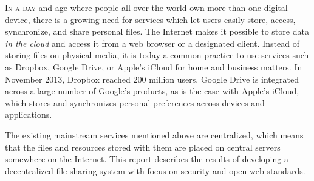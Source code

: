 \lettrine[lines=2, findent=2pt]{I}{n a day} and age where people all over the world own more than one digital device\cite{OFCOMa:Online}\cite{OFCOMb:Online}, there is a growing need for services which let users easily store, access, synchronize, and share personal files. The Internet makes it possible to store data \emph{in the cloud} and access it from a web browser or a designated client. Instead of storing files on physical media, it is today a common practice to use services such as Dropbox, Google Drive, or Apple's iCloud for home and business matters. In November 2013, Dropbox reached 200 million users\cite{Constine:2013:Online}. Google Drive is integrated across a large number of Google's products, as is the case with Apple's iCloud, which stores and synchronizes personal preferences across devices and applications\cite{CloudTrend:Online}.

The existing mainstream services mentioned above are centralized, which means that the files and resources stored with them are placed on central servers somewhere on the Internet. This report describes the results of developing a decentralized file sharing system with focus on security and open web standards.







